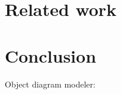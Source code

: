 \documentclass[sigconf]{acmart}
\begin{document}
\section{Related work} \label{sec:relatedWork}

\section{Conclusion} \label{sec:conclusion}

Object diagram modeler: \cite{timkrauterObjectDiagramModeler2023}




\end{document}
